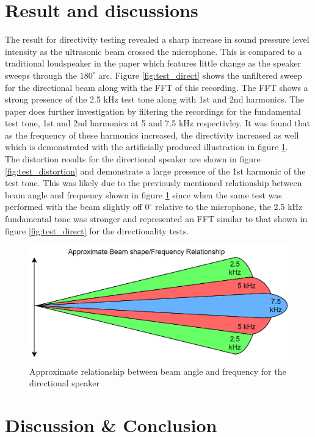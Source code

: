 \documentclass[final,32pt]{beamer}
\begin{document}
\begin{frame}[t]
\begin{multicols}{3}
\section{Result and discussions}
The result for directivity testing revealed a sharp increase in sound pressure level intensity as the ultrasonic beam crossed the microphone. This is compared to a traditional loudspeaker in the paper which features little change as the speaker sweeps through the $180^\circ$ arc. Figure \ref{fig:test_direct} shows the unfiltered sweep for the directional beam along with the FFT of this recording. The FFT shows a strong presence of the 2.5 kHz test tone along with 1st and 2nd harmonics. The paper does further investigation by filtering the recordings for the fundamental test tone, 1st and 2nd harmonics at 5 and 7.5 kHz respectivley. It was found that as the frequency of these harmonics increased, the directivity increased as well which is demonstrated with the artificially produced illustration in figure \ref{fig:approxbeamfreq}.\\
The distortion results for the directional speaker are shown in figure \ref{fig:test_distortion} and demonstrate a large presence of the 1st harmonic of the test tone. This was likely due to the previously mentioned relationship between beam angle and frequency shown in figure \ref{fig:approxbeamfreq} since when the same test was performed with the beam slightly off $0^\circ$ relative to the microphone, the 2.5 kHz fundamental tone was stronger and represented an FFT similar to that shown in figure \ref{fig:test_direct} for the directionality tests.

\begin{figure}[ht!]
    \centering
    \includegraphics[width=0.8\columnwidth]{Figures/Test/beamangle_illustration (1).png}
    \setlength{\belowcaptionskip}{-10pt}
    \caption{Approximate relationship between beam angle and frequency for the directional speaker}
    \label{fig:approxbeamfreq}
\end{figure}


\section{Discussion \& Conclusion}



\end{multicols}
\end{frame}
\end{document}
